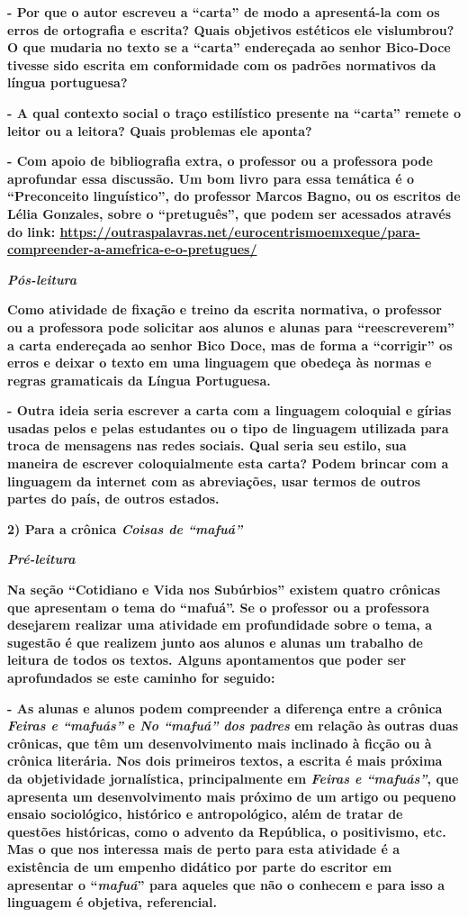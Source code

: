 \textbf{- Por que o autor escreveu a ``carta'' de modo a apresentá-la
com os erros de ortografia e escrita? Quais objetivos estéticos ele
vislumbrou? O que mudaria no texto se a ``carta'' endereçada ao senhor
Bico-Doce tivesse sido escrita em conformidade com os padrões normativos
da língua portuguesa?}

\textbf{- A qual contexto social o traço estilístico presente na
``carta'' remete o leitor ou a leitora? Quais problemas ele aponta?}

\textbf{- Com apoio de bibliografia extra, o professor ou a professora
pode aprofundar essa discussão. Um bom livro para essa temática é o
``Preconceito linguístico'', do professor Marcos Bagno, ou os escritos
de Lélia Gonzales, sobre o ``pretuguês'', que podem ser acessados
através do link:
\url{https://outraspalavras.net/eurocentrismoemxeque/para-compreender-a-amefrica-e-o-pretugues/}}

\textbf{\emph{Pós-leitura} }

\textbf{Como atividade de fixação e treino da escrita normativa, o
professor ou a professora pode solicitar aos alunos e alunas para
``reescreverem'' a carta endereçada ao senhor Bico Doce, mas de forma a
``corrigir'' os erros e deixar o texto em uma linguagem que obedeça às
normas e regras gramaticais da Língua Portuguesa.}

\textbf{- Outra ideia seria escrever a carta com a linguagem coloquial e
gírias usadas pelos e pelas estudantes ou o tipo de linguagem utilizada
para troca de mensagens nas redes sociais. Qual seria seu estilo, sua
maneira de escrever coloquialmente esta carta? Podem brincar com a
linguagem da internet com as abreviações, usar termos de outros partes
do país, de outros estados. }

\textbf{2) Para a crônica \emph{Coisas de ``mafuá''}}

\emph{\textbf{Pré-leitura}}

\textbf{Na seção ``Cotidiano e Vida nos Subúrbios'' existem quatro
crônicas que apresentam o tema do ``mafuá''. Se o professor ou a
professora desejarem realizar uma atividade em profundidade sobre o
tema, a sugestão é que realizem junto aos alunos e alunas um trabalho de
leitura de todos os textos. Alguns apontamentos que poder ser
aprofundados se este caminho for seguido:}

\textbf{- As alunas e alunos podem compreender a diferença entre a
crônica \emph{Feiras e ``mafuás''} e \emph{No ``mafuá'' dos padres} em
relação às outras duas crônicas, que têm um desenvolvimento mais
inclinado à ficção ou à crônica literária. Nos dois primeiros textos, a
escrita é mais próxima da objetividade jornalística, principalmente em
\emph{Feiras e ``mafuás''}, que apresenta um desenvolvimento mais
próximo de um artigo ou pequeno ensaio sociológico, histórico e
antropológico, além de tratar de questões históricas, como o advento da
República, o positivismo, etc. Mas o que nos interessa mais de perto
para esta atividade é a existência de um empenho didático por parte do
escritor em apresentar o ``\emph{mafuá}'' para aqueles que não o
conhecem e para isso a linguagem é objetiva, referencial. }


